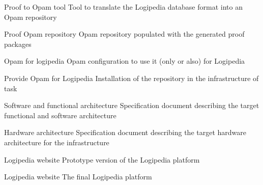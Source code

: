 \begin{workpackage}[id=access,type=RTD,
  short=Access,%
  title={Access},
  lead=Irt,IrtRM=23,OcaRM=6,EduRM=12,InrRM=18]
\begin{tasklist}
\end{tasklist}

\begin{wpdelivs}

  
  \begin{wpdeliv}[due=18,miles=???,id=opamtool,dissem=PU,nature=OTHER,lead=Oca]{Proof to Opam tool}
    Tool to translate the Logipedia database format into an Opam repository
  \end{wpdeliv}

  \begin{wpdeliv}[due=19,miles=???,id=opamrepo,dissem=PU,nature=OTHER,lead=Oca]{Proof Opam repository}
    Opam repository populated with the generated proof packages
  \end{wpdeliv}

  \begin{wpdeliv}[due=20,miles=???,id=opamconfig,dissem=PU,nature=OTHER,lead=Oca]{Opam for logipedia}
    Opam configuration to use it (only or also) for Logipedia
  \end{wpdeliv}

  \begin{wpdeliv}[due=21,miles=???,id=opaminstall,dissem=PU,nature=OTHER,lead=Oca]{Provide Opam for Logipedia}
    Installation of the repository in the infrastructure of task 
  \end{wpdeliv}

  
  \begin{wpdeliv}[due=5,miles=???,id=archi-spec,dissem=PU,nature=R,lead=Irt]{Software and functional architecture}
    Specification document describing the target functional and software architecture
  \end{wpdeliv}

  \begin{wpdeliv}[due=7,miles=???,id=infra-spec,dissem=PU,nature=R,lead=Irt]{Hardware architecture}
    Specification document describing the target hardware architecture for the infrastructure
  \end{wpdeliv}

  \begin{wpdeliv}[due=14,miles=???,id=website,dissem=PU,nature=DEM,lead=Irt]{Logipedia website}
    Prototype version of the Logipedia platform
  \end{wpdeliv}

  \begin{wpdeliv}[due=27,miles=???,id=website,dissem=PU,nature=OTHER,lead=Irt]{Logipedia website}
    The final Logipedia platform
  \end{wpdeliv}


\end{wpdelivs}
\end{workpackage}
